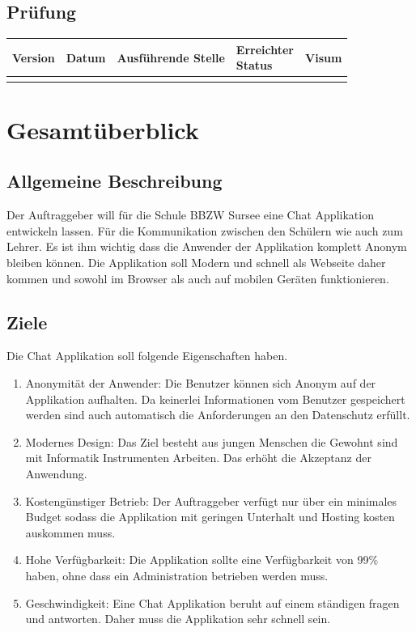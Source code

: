 \documentclass[12pt]{article}
\begin{document}
  \subsection{Prüfung}
    \begin{tabu} to \textwidth  {|l|l|l|X|l|}
      \hline
      \textbf{Version} & \textbf{Datum} & \textbf{Ausführende Stelle}   & \textbf{Erreichter \newline Status}  & \textbf{Visum}  \\ \hline
                       &                &                               &                             &                 \\ \hline
    \end{tabu}

  \newpage
  \tableofcontents
  \newpage



  \section{Gesamtüberblick}
    \subsection{Allgemeine Beschreibung}
      Der Auftraggeber will für die Schule BBZW Sursee eine Chat Applikation entwickeln lassen.
      Für die Kommunikation zwischen den Schülern wie auch zum Lehrer. Es ist ihm wichtig dass
      die Anwender der Applikation komplett Anonym bleiben können. Die Applikation soll
      Modern und schnell als Webseite daher kommen und sowohl im Browser als auch
      auf mobilen Geräten funktionieren.

    \subsection{Ziele}
      Die Chat Applikation soll folgende Eigenschaften haben.

      \begin{enumerate}
        \item Anonymität der Anwender: Die Benutzer können sich Anonym auf der Applikation aufhalten.
          Da keinerlei Informationen vom Benutzer gespeichert werden sind auch automatisch
          die Anforderungen an den Datenschutz erfüllt.
        \item Modernes Design: Das Ziel besteht aus jungen Menschen die Gewohnt sind mit
          Informatik Instrumenten Arbeiten. Das erhöht die Akzeptanz der Anwendung.
        \item Kostengünstiger Betrieb: Der Auftraggeber verfügt nur über ein minimales Budget
          sodass die Applikation mit geringen Unterhalt und Hosting kosten auskommen muss.
        \item Hohe Verfügbarkeit: Die Applikation sollte eine Verfügbarkeit von 99\% haben,
          ohne dass ein Administration betrieben werden muss.
        \item Geschwindigkeit: Eine Chat Applikation beruht auf einem ständigen fragen und antworten. \newline
          Daher muss die Applikation sehr schnell sein.
      \end{enumerate}
\end{document}
